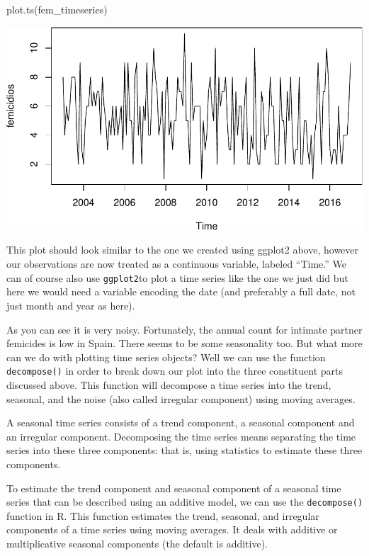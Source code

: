 \documentclass[
]{book}
\makeatletter
\newenvironment{Shaded}{\begin{snugshade}}{\end{snugshade}}
\newcommand{\FunctionTok}[1]{\textcolor[rgb]{0,0,0}{#1}}
\newcommand{\NormalTok}[1]{#1}
\newenvironment{kframe}{%
\medskip{}
\setlength{\fboxsep}{.8em}
 \def\at@end@of@kframe{}%
 \ifinner\ifhmode%
  \def\at@end@of@kframe{\end{minipage}}%
  \begin{minipage}{\columnwidth}%
 \fi\fi%
 \def\FrameCommand##1{\hskip\@totalleftmargin \hskip-\fboxsep
 \colorbox{shadecolor}{##1}\hskip-\fboxsep
     \hskip-\linewidth \hskip-\@totalleftmargin \hskip\columnwidth}%
 \MakeFramed {\advance\hsize-\width
   \@totalleftmargin\z@ \linewidth\hsize
   \@setminipage}}%
 {\par\unskip\endMakeFramed%
 \at@end@of@kframe}
\renewenvironment{Shaded}{\begin{kframe}}{\end{kframe}}
\makeatother
\begin{document}
\begin{Shaded}
\begin{Highlighting}[]
\FunctionTok{plot.ts}\NormalTok{(fem\_timeseries)}
\end{Highlighting}
\end{Shaded}

\includegraphics{crime_mapping_files/figure-latex/plot.ts_8a-1.pdf}

This plot should look similar to the one we created using ggplot2 above, however our observations are now treated as a continuous variable, labeled ``Time.'' We can of course also use \texttt{ggplot2}to plot a time series like the one we just did but here we would need a variable encoding the date (and preferably a full date, not just month and year as here).

As you can see it is very noisy. Fortunately, the annual count for intimate partner femicides is low in Spain. There seems to be some seasonality too. But what more can we do with plotting time series objects? Well we can use the function \texttt{decompose()} in order to break down our plot into the three constituent parts discussed above. This function will decompose a time series into the trend, seasonal, and the noise (also called irregular component) using moving averages.

A seasonal time series consists of a trend component, a seasonal component and an irregular component. Decomposing the time series means separating the time series into these three components: that is, using statistics to estimate these three components.

To estimate the trend component and seasonal component of a seasonal time series that can be described using an additive model, we can use the \texttt{decompose()} function in R. This function estimates the trend, seasonal, and irregular components of a time series using moving averages. It deals with additive or multiplicative seasonal components (the default is additive).
\end{document}
